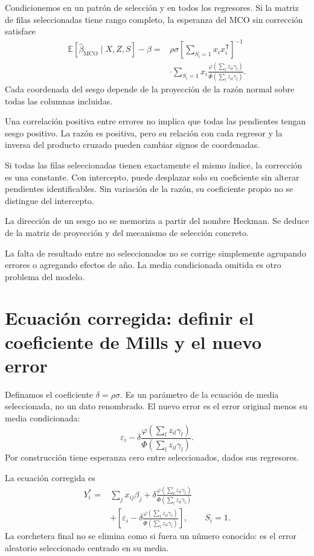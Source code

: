 \documentclass[11pt,a4paper]{article}
\newcommand{\E}{\mathbb E}
\newcommand{\T}{^{\mathsf T}}
\begin{document}
Condicionemos en un patrón de
selección y en todos los regresores.
Si la matriz de filas seleccionadas
tiene rango completo, la esperanza
del MCO sin corrección satisface
\[
\begin{aligned}
\E[\widehat\beta_{\mathrm{MCO}}\mid X,Z,S]-\beta
={}&\rho\sigma
\left[\sum_{S_i=1}x_ix_i\T\right]^{-1}\\
&\cdot\sum_{S_i=1}x_i
\frac{\varphi(\sum_lz_{il}\gamma_l)}
{\Phi(\sum_lz_{il}\gamma_l)}.
\end{aligned}
\]
Cada coordenada del sesgo
depende de la proyección
de la razón normal sobre
todas las columnas incluidas.

Una correlación positiva entre errores
no implica que todas las
pendientes tengan sesgo positivo.
La razón es positiva,
pero su relación con
cada regresor y la inversa
del producto cruzado pueden
cambiar signos de coordenadas.

\begin{ejemplo}
Si todas las filas seleccionadas
tienen exactamente el mismo índice,
la corrección es una constante.
Con intercepto, puede desplazar
solo su coeficiente sin
alterar pendientes identificables.
Sin variación de la razón,
su coeficiente propio no se
distingue del intercepto.
\end{ejemplo}
La dirección de un sesgo
no se memoriza a partir
del nombre Heckman.
Se deduce de la matriz
de proyección y del mecanismo
de selección concreto.

La falta de resultado entre
no seleccionados no se corrige
simplemente agrupando errores
o agregando efectos de año.
La media condicionada omitida
es otro problema del modelo.

\clearpage
\section{Ecuación corregida: definir el coeficiente de Mills y el nuevo error}\label{unidad127}
Definamos el coeficiente
\(\delta=\rho\sigma\).
Es un parámetro de la ecuación
de media seleccionada,
no un dato renombrado.
El nuevo error es
el error original menos
su media condicionada:
\[
\varepsilon_i-
\delta\frac{\varphi(\sum_lz_{il}\gamma_l)}
{\Phi(\sum_lz_{il}\gamma_l)}.
\]
Por construcción tiene
esperanza cero entre seleccionados,
dados sus regresores.

La ecuación corregida es
\[
\begin{aligned}
Y_i^\ast
={}&\sum_jx_{ij}\beta_j
+\delta\frac{\varphi(\sum_lz_{il}\gamma_l)}
{\Phi(\sum_lz_{il}\gamma_l)}\\
&+\left[
\varepsilon_i-\delta
\frac{\varphi(\sum_lz_{il}\gamma_l)}
{\Phi(\sum_lz_{il}\gamma_l)}
\right],\qquad S_i=1.
\end{aligned}
\]
La corchetera final no se elimina
como si fuera un número conocido:
es el error aleatorio seleccionado
centrado en su media.
\end{document}

